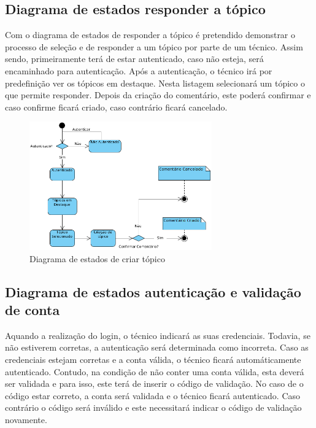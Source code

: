\newpage

\subsection{Diagrama de estados responder a tópico}

Com o diagrama de estados de responder a tópico é pretendido demonstrar o processo de seleção e de responder a um tópico por parte de um técnico. Assim sendo, primeiramente terá de estar autenticado, caso não esteja, será encaminhado para autenticação. Após a autenticação, o técnico irá por predefinição ver os tópicos em destaque. Nesta listagem selecionará um tópico o que permite responder. Depois da criação do comentário, este poderá confirmar e caso confirme ficará criado, caso contrário ficará cancelado.

\begin{figure}[htb]
    \centering
    \includegraphics[width=0.7\textwidth]{images/diagramas/estados/responder_topico_tecnico.png}
    \caption{Diagrama de estados de criar tópico}
    \label{fig:41}
\end{figure}

\newpage

\subsection{Diagrama de estados autenticação e validação de conta}

Aquando a realização do login, o técnico indicará as suas credenciais. Todavia, se não estiverem corretas, a autenticação será determinada como incorreta. Caso as credenciais estejam corretas e a conta válida, o técnico ficará automáticamente autenticado. Contudo, na condição de não conter uma conta válida, esta deverá ser validada e para isso, este terá de inserir o código de validação. No caso de o código estar correto, a conta será validada e o técnico ficará autenticado. Caso contrário o código será inválido e este necessitará indicar o código de validação novamente.

